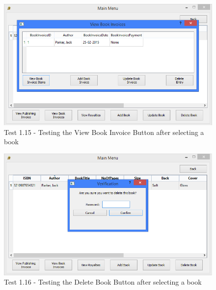 \begin{landscape}
\begin{figure}[H]
    \includegraphics[width=\textwidth]{./Testing/Evidence/ViewBookInvoiceButtonTest.png}
    \caption{Test 1.15 - Testing the View Book Invoice Button after selecting a book}  \label{fig:ViewBookInvoiceButtonTest}
\end{figure}

\begin{figure}[H]
    \includegraphics[width=\textwidth]{./Testing/Evidence/DeleteBookButtonTest.png}
    \caption{Test 1.16 - Testing the Delete Book Button after selecting a book}  \label{fig:DeleteBookButtonTest}
\end{figure}


\end{landscape}
